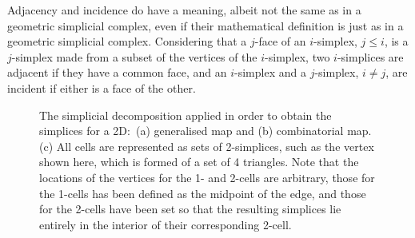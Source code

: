 Adjacency and incidence do have a meaning, albeit not the same as in a geometric simplicial complex, even if their mathematical definition is just as in a geometric simplicial complex.
Considering that a $j$-face of an $i$-simplex, $j \leq i$, is a $j$-simplex made from a subset of the vertices of the $i$-simplex, two $i$-simplices are adjacent if they have a common face, and an $i$-simplex and a $j$-simplex, $i \neq j$, are incident if either is a face of the other.
\begin{figure}[tb]
\centering
{}
\quad
{}
\quad
{}
\caption[Simplices in a generalised map and a combinatorial map]{The simplicial decomposition applied in order to obtain the simplices for a 2D:\ (a) generalised map and (b) combinatorial map. (c) All cells are represented as sets of 2-simplices, such as the vertex shown here, which is formed of a set of 4 triangles.
Note that the locations of the vertices for the 1- and 2-cells are arbitrary, those for the 1-cells has been defined as the midpoint of the edge, and those for the 2-cells have been set so that the resulting simplices lie entirely in the interior of their corresponding 2-cell.}
\label{fig:simplices}
\end{figure}
